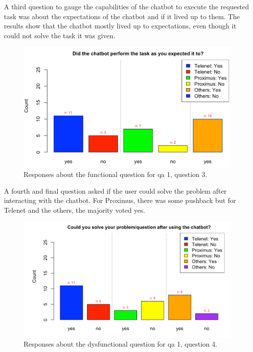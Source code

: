 \break
A third question to gauge the capabilities of the chatbot to execute the requested task was about the expectations of the chatbot and if it lived up to them. The results show that the chatbot mostly lived up to expectations, even though it could not solve the task it was given.\\
\begin{figure}[!htb]
	\includegraphics[width=\linewidth, scale=0.5]{../LaTeX/Figures/Comparative/Q1c.png}
	\caption{Responses about the functional question for \acrshort{qa} 1, question 3.}\label{fig:Q1c}
\end{figure}
A fourth and final question asked if the user could solve the problem after interacting with the chatbot. For Proximus, there was some pushback but for Telenet and the others, the majority voted yes.\\
\begin{figure}[!htb]
	\includegraphics[width=\linewidth, scale=0.5]{../LaTeX/Figures/Comparative/DQ1c.png}
	\caption{Responses about the dysfunctional question for \acrshort{qa} 1, question 4.}\label{fig:DQ1c}
\end{figure}
